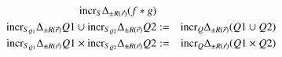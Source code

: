 \documentclass{article}
\begin{document}
\begin{figure*}
\begin{eqnarray}
\mathrm{incr}_{S} \Delta_{\pm R(\vec{r})} (f * g)
\\
\label{eq:fs3}
\mathrm{incr}_{S_{Q1}} \Delta_{\pm R(\vec{r})} Q1 \cup \mathrm{incr}_{S_{Q2}} \Delta_{\pm R(\vec{r})} Q2
&:=&
\mathrm{incr}_{Q} \Delta_{\pm R(\vec{r})} (Q1 \cup Q2)
\\
\label{eq:fs4}
\mathrm{incr}_{S_{Q1}} \Delta_{\pm R(\vec{r})} Q1 \times \mathrm{incr}_{S_{Q2}} \Delta_{\pm R(\vec{r})} Q2
&:=&
\mathrm{incr}_{Q} \Delta_{\pm R(\vec{r})} (Q1 \times Q2)
\end{eqnarray}
\end{figure*}
\end{document}
